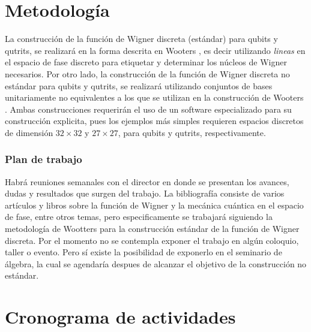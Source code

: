 \documentclass[a4paper]{article}
\begin{document}
  \section{Metodología}

  La construcción de la función de Wigner discreta
  (estándar) para qubits y qutrits, se realizará en la forma
  descrita en Wooters \cite{gibbons2004}, es decir
  utilizando \textit{lineas} en el espacio de fase discreto
  para etiquetar y determinar los núcleos de Wigner
  necesarios.  Por otro lado, la construcción de la función
  de Wigner discreta no estándar para qubits y qutrits, se
  realizará utilizando conjuntos de bases unitariamente no
  equivalentes a los que se utilizan en la construcción de
  Wooters \cite{kantor2012}. Ambas construcciones requerirán
  el uso de un software especializado para su construcción
  explicita, pues los ejemplos más simples requieren
  espacios discretos de dimensión $32 \times 32$ y $27
  \times 27$, para qubits y qutrits, respectivamente.

  \subsubsection{Plan de trabajo}

  Habrá reuniones semanales con el director en donde se
  presentan los avances, dudas y resultados que surgen del
  trabajo. La bibliografía consiste de varios artículos y
  libros sobre la función de Wigner y la mecánica cuántica
  en el espacio de fase, entre otros temas, pero
  especificamente se trabajará siguiendo la metodología de
  Wootters \cite{gibbons2004} para la
  construcción estándar de la función de Wigner discreta.
  Por el momento no se contempla exponer el trabajo en algún
  coloquio, taller o evento. Pero sí existe la posibilidad
  de exponerlo en el seminario de álgebra, la cual se
  agendaría despues de alcanzar el objetivo de la
  construcción no estándar.

  \section{Cronograma de actividades}
\end{document}
